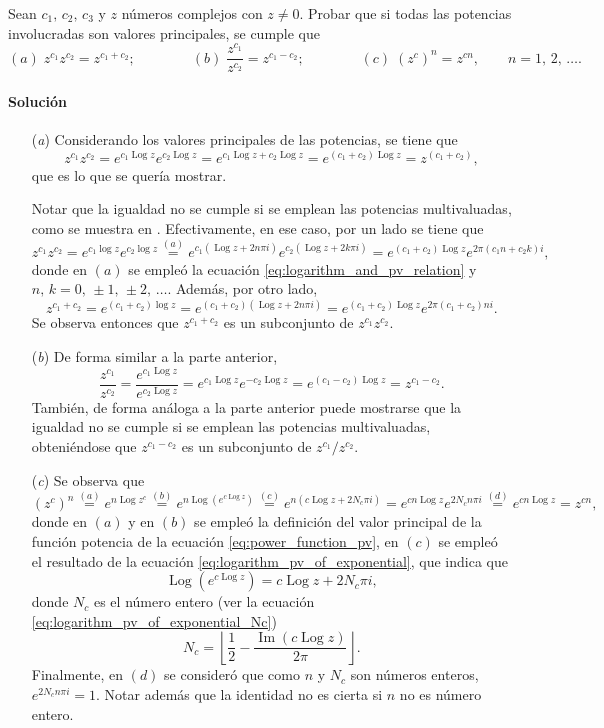 \documentclass[a4paper]{report}
\renewcommand{\Im}{\operatorname{Im}}
\DeclareMathOperator{\Log}{Log}
\begin{document}
Sean \(c_1,\,c_2,\,c_3\) y \(z\) números complejos con \(z\neq0\). Probar que si todas las potencias involucradas son valores principales, se cumple que 
\[
 (\textit{a})\;z^{c_1}z^{c_2}=z^{c_1+c_2};\qquad\qquad 
 (\textit{b})\;\frac{z^{c_1}}{z^{c_2}}=z^{c_1-c_2};\qquad\qquad
 (\textit{c})\;(z^c)^n=z^{cn},\qquad n=1,\,2,\,\dots.
\]

\paragraph{Solución} 

\begin{enumerate}
 \item[(\textit{a})] Considerando los valores principales de las potencias, se tiene que 
 \[
  z^{c_1}z^{c_2}=e^{c_1\Log z}e^{c_2\Log z}=e^{c_1\Log z+c_2\Log z}=e^{(c_1+c_2)\Log z}=z^(c_1+c_2),
 \]
 que es lo que se quería mostrar. 
 
 Notar que la igualdad no se cumple si se emplean las potencias multivaluadas, como se muestra en \cite{haber2019complex}. Efectivamente, en ese caso, por un lado se tiene que 
 \[
  z^{c_1}z^{c_2}=e^{c_1\log z}e^{c_2\log z}\overset{(a)}{=}e^{c_1(\Log z+2n\pi i)}e^{c_2(\Log z+2k\pi i)}
   =e^{(c_1+c_2)\Log z}e^{2\pi(c_1n+c_2k)i},
 \]
 donde en \((a)\) se empleó la ecuación \ref{eq:logarithm_and_pv_relation} y \(n,\,k=0,\,\pm1,\,\pm2,\,\dots\). Además, por otro lado,
 \[
  z^{c_1+c_2}=e^{(c_1+c_2)\log z}=e^{(c_1+c_2)(\Log z+2n\pi i)}=e^{(c_1+c_2)\Log z}e^{2\pi(c_1+c_2)ni}.
 \]
 Se observa entonces que \(z^{c_1+c_2}\) es un subconjunto de \(z^{c_1}z^{c_2}\).
 \item[(\textit{b})] De forma similar a la parte anterior,
 \[
  \frac{z^{c_1}}{z^{c_2}}=\frac{e^{c_1\Log z}}{e^{c_2\Log z}}=e^{c_1\Log z}e^{-c_2\Log z}=e^{(c_1-c_2)\Log z}=z^{c_1-c_2}.
 \]
 También, de forma análoga a la parte anterior puede mostrarse que la igualdad no se cumple si se emplean las potencias multivaluadas, obteniéndose que \(z^{c_1-c_2}\) es un subconjunto de \(z^{c_1}/z^{c_2}\).
 \item[(\textit{c})] Se observa que 
 \[
  (z^c)^n\overset{(a)}{=}e^{n\Log z^c}\overset{(b)}{=}e^{n\Log(e^{c\Log z})}
  \overset{(c)}{=}e^{n(c\Log z+2N_c\pi i)}
  =e^{cn\Log z}e^{2N_cn\pi i}
  \overset{(d)}{=}e^{cn\Log z}
  =z^{cn},
 \]
 donde en \((a)\) y en \((b)\) se empleó la definición del valor principal de la función potencia de la ecuación \ref{eq:power_function_pv}, en \((c)\) se empleó el resultado de la ecuación \ref{eq:logarithm_pv_of_exponential}, que indica que
 \[
  \Log(e^{c\Log z})=c\Log z+2N_c\pi i,  
 \]
 donde \(N_c\) es el número entero (ver la ecuación \ref{eq:logarithm_pv_of_exponential_Nc})
 \[
  N_c=\left\lfloor\frac{1}{2}-\frac{\Im(c\Log z)}{2\pi}\right\rfloor.
 \]
 Finalmente, en \((d)\) se consideró que como \(n\) y \(N_c\) son números enteros, \(e^{2N_cn\pi i}=1\). Notar además que la identidad no es cierta si \(n\) no es número entero.
 

\end{enumerate}
\end{document}
